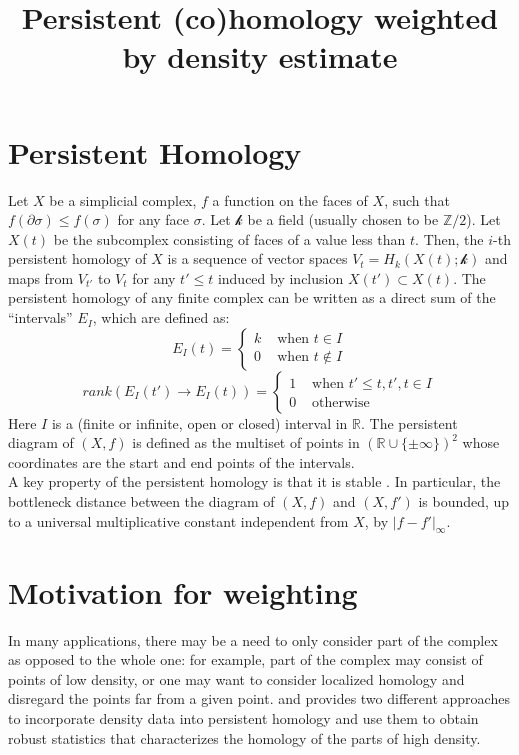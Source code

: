 \documentclass[11pt]{article}
\title{Persistent (co)homology weighted by density estimate}
\theoremstyle{plain}
\theoremstyle{definition}
\theoremstyle{definition}
\theoremstyle{definition}
\theoremstyle{definition}
\theoremstyle{definition}
\theoremstyle{definition}
\theoremstyle{definition}
\theoremstyle{definition}
\begin{document}
\maketitle

\section{Persistent Homology}

Let $X$ be a simplicial complex, $f$ a function on the faces of $X$, such that $f(\partial \sigma)\leq f(\sigma)$ for any face $\sigma$. Let $\mathcal{k}$ be a field (usually chosen to be $\mathbb{Z}/2$). Let $X(t)$ be the subcomplex consisting of faces of a value less than $t$. Then, the $i$-th persistent homology of $X$ is a sequence of vector spaces $V_t=H_k(X(t); \mathcal{k})$ and maps from $V_{t'}$ to $V_t$ for any $t'\leq t$ induced by inclusion $X(t')\subset X(t)$. The persistent homology of any finite complex can be written as a direct sum of the ``intervals'' $E_I$, which are defined as:
\[E_I(t)=\begin{cases} k & \text{ when } t\in I\\ 0 &\text{ when }t\not\in I\end{cases}\]
\[rank(E_I(t')\rightarrow E_I(t))=\begin{cases} 1 & \text{ when }t'\leq t, t', t\in I\\ 0 & \text{ otherwise }\end{cases}\]
Here $I$ is a (finite or infinite, open or closed) interval in $\mathbb{R}$. The persistent diagram of $(X, f)$ is defined as the multiset of points in $(\mathbb{R}\cup\{\pm\infty\})^2$ whose coordinates are the start and end points of the intervals.\\

A key property of the persistent homology is that it is stable \cite{CdSO}. In particular, the bottleneck distance between the diagram of $(X, f)$ and $(X, f')$ is bounded, up to a universal multiplicative constant independent from $X$, by $|f-f'|_\infty$.\\

\section{Motivation for weighting}

In many applications, there may be a need to only consider part of the complex as opposed to the whole one: for example, part of the complex may consist of points of low density, or one may want to consider localized homology and disregard the points far from a given point. \cite{B} and \cite{C} provides two different approaches to incorporate density data into persistent homology and use them to obtain robust statistics that characterizes the homology of the parts of high density. \\
\end{document}
